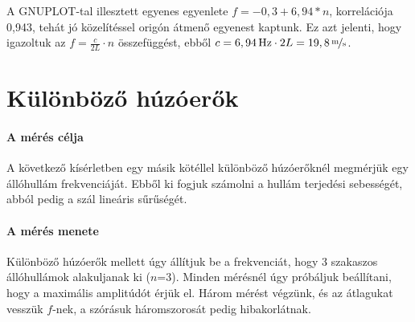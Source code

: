 \documentclass[12pt]{article}
\begin{document}
A GNUPLOT-tal illesztett egyenes egyenlete $f=-0,3+6,94*n$, korrelációja 0,943, tehát jó közelítéssel origón átmenő egyenest kaptunk. Ez azt jelenti, hogy igazoltuk az $f=\frac{c}{2L}\cdot n$ összefüggést, ebből $c=\unit[6,94]{Hz}\cdot 2L=\unitfrac[19,8]{m}{s}$.


\section{Különböző húzóerők}

\paragraph{A mérés célja}

A következő kísérletben egy másik kötéllel különböző húzóerőknél megmérjük egy állóhullám frekvenciáját. Ebből ki fogjuk számolni a hullám terjedési sebességét, abból pedig a szál lineáris sűrűségét.

\paragraph{A mérés menete}

Különböző húzóerők mellett úgy állítjuk be a frekvenciát, hogy 3 szakaszos állóhullámok alakuljanak ki ($n$=3). Minden mérésnél úgy próbáljuk beállítani, hogy a maximális amplitúdót érjük el. Három mérést végzünk, és az átlagukat vesszük $f$-nek, a szórásuk háromszorosát pedig hibakorlátnak.
\end{document}
